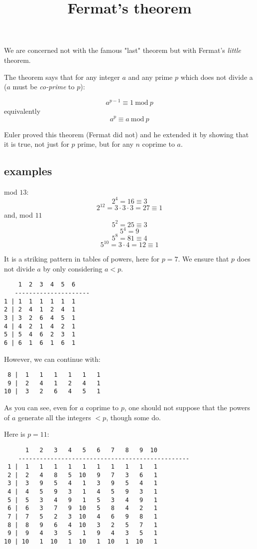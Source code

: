 \documentclass[11pt, oneside]{article}
\title{Fermat's theorem}
\date{}
\begin{document}
\maketitle
\Large


We are concerned not with the famous "last" theorem but with Fermat's \emph{little} theorem.

The theorem says that for any integer $a$ and any prime $p$ which does not divide a ($a$ must be \emph{co-prime} to $p$):

\[ a^{p-1} \equiv 1 \ \text{mod} \ p \]
equivalently
\[ a^p \equiv a \ \text{mod} \ p \]

Euler proved this theorem (Fermat did not) and he extended it by showing that it is true, not just for $p$ prime, but for any $n$ coprime to $a$.

\subsection*{examples}

mod $13$:
\[ 2^4 = 16 \equiv 3 \]
\[ 2^{12} = 3 \cdot 3 \cdot 3 = 27 \equiv 1 \]
and, mod $11$
\[ 5^2 = 25 \equiv 3 \]
\[ 5^4 = 9 \]
\[ 5^8 = 81 \equiv 4 \]
\[ 5^{10} = 3 \cdot 4 = 12 \equiv 1 \]

It is a striking pattern in tables of powers, here for $p = 7$.  We ensure that $p$ does not divide $a$ by only considering $a < p$.

\begin{verbatim}
    1  2  3  4  5  6
   ---------------------
1 | 1  1  1  1  1  1
2 | 2  4  1  2  4  1
3 | 3  2  6  4  5  1
4 | 4  2  1  4  2  1
5 | 5  4  6  2  3  1  
6 | 6  1  6  1  6  1
\end{verbatim}

However, we can continue with:

\begin{verbatim}
 8 |  1   1   1   1   1   1
 9 |  2   4   1   2   4   1  
10 |  3   2   6   4   5   1
\end{verbatim}


As you can see, even for $a$ coprime to $p$, one should not suppose that the powers of $a$ generate all the integers $< p$, though some do.

Here is $p = 11$:

\begin{verbatim}
      1   2   3   4   5   6   7   8   9  10
    ------------------------------------------------
 1 |  1   1   1   1   1   1   1   1   1   1
 2 |  2   4   8   5  10   9   7   3   6   1
 3 |  3   9   5   4   1   3   9   5   4   1
 4 |  4   5   9   3   1   4   5   9   3   1
 5 |  5   3   4   9   1   5   3   4   9   1
 6 |  6   3   7   9  10   5   8   4   2   1
 7 |  7   5   2   3  10   4   6   9   8   1
 8 |  8   9   6   4  10   3   2   5   7   1   
 9 |  9   4   3   5   1   9   4   3   5   1   
10 | 10   1  10   1  10   1  10   1  10   1
\end{verbatim}
\end{document}
